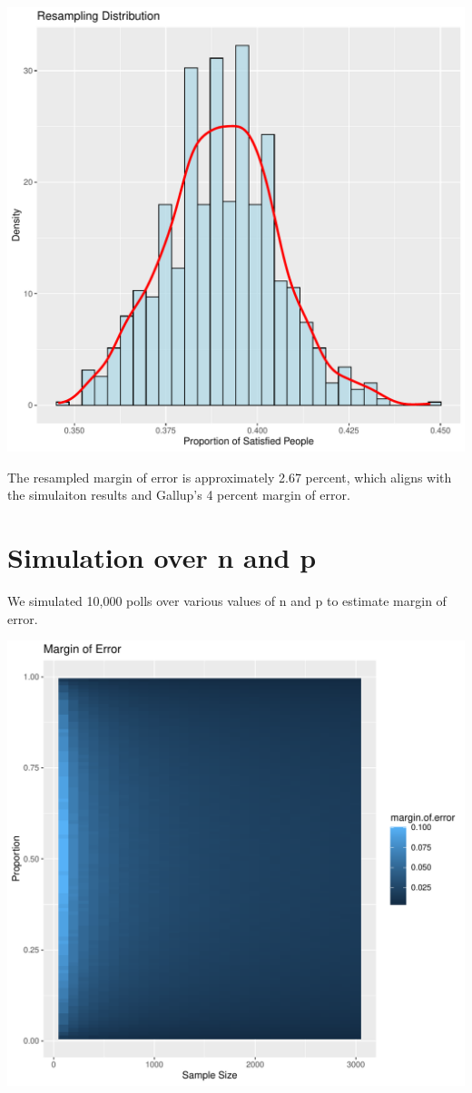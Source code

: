 \documentclass{article}\usepackage[]{graphicx}\usepackage[]{xcolor}
\newenvironment{Figure}
  {\par\medskip\noindent\minipage{\linewidth}}
  {\endminipage\par\medskip}
\begin{document}
\begin{multicols}{2}
\begin{Figure}
\includegraphics[width=\linewidth]{plot 3.pdf}
\end{Figure}

The resampled margin of error is approximately 2.67 percent, which aligns with the simulaiton results and Gallup's 4 percent margin of error. 

\section{Simulation over n and p}
We simulated 10,000 polls over various values of n and p to estimate margin of error. 

\begin{Figure}
\includegraphics[width=\linewidth]{plot 4.pdf}
\end{Figure}


\end{multicols}
\end{document}
